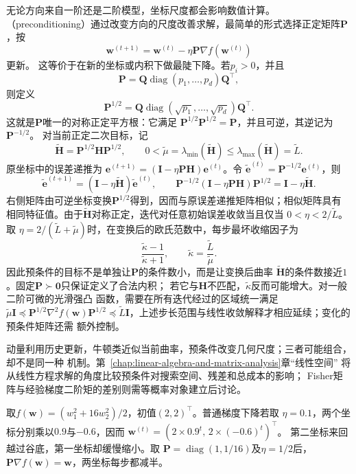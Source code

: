 无论方向来自一阶还是二阶模型，坐标尺度都会影响数值计算。
（preconditioning）通过改变方向的尺度改善求解，最简单的形式选择正定矩阵$\bm{P}$，按
\[
  \bm{w}^{(t+1)}
  =
  \bm{w}^{(t)}-\eta\bm{P}\nabla f(\bm{w}^{(t)})
\]
更新。
这等价于在新的坐标或内积下做最陡下降。若\(p_i>0\)，并且
\[
  \bm{P}
  =
  \bm{Q}\operatorname{diag}(p_1,\ldots,p_d)\bm{Q}^{\top},
\]
则定义
\[
  \bm{P}^{1/2}
  =
  \bm{Q}\operatorname{diag}(\sqrt{p_1},\ldots,\sqrt{p_d})\bm{Q}^{\top}.
\]
这就是$\bm{P}$唯一的对称正定平方根：它满足
$\bm{P}^{1/2}\bm{P}^{1/2}=\bm{P}$，并且可逆，其逆记为$\bm{P}^{-1/2}$。
对当前正定二次目标，记
\[
  \widetilde{\bm{H}}=\bm{P}^{1/2}\bm{H}\bm{P}^{1/2},
  \qquad
  0<\widetilde{\mu}
  =\lambda_{\min}(\widetilde{\bm{H}})
  \leq\lambda_{\max}(\widetilde{\bm{H}})
  =\widetilde{L}.
\]
原坐标中的误差递推为
$\bm{e}^{(t+1)}=(\bm{I}-\eta\bm{P}\bm{H})\bm{e}^{(t)}$。令
$\widetilde{\bm{e}}^{(t)}=\bm{P}^{-1/2}\bm{e}^{(t)}$，则
\[
  \widetilde{\bm{e}}^{(t+1)}
  =
  (\bm{I}-\eta\widetilde{\bm{H}})
  \widetilde{\bm{e}}^{(t)},
  \qquad
  \bm{P}^{-1/2}
  (\bm{I}-\eta\bm{P}\bm{H})
  \bm{P}^{1/2}
  =
  \bm{I}-\eta\widetilde{\bm{H}}.
\]
右侧矩阵由可逆坐标变换$\bm{P}^{1/2}$得到，因而与原误差递推矩阵相似；相似矩阵具有
相同特征值。由于$\widetilde{\bm{H}}$对称正定，迭代对任意初始误差收敛当且仅当
$0<\eta<2/\widetilde{L}$。取
$\eta=2/(\widetilde{L}+\widetilde{\mu})$时，在变换后的欧氏范数中，每步最坏收缩因子为
\[
  \frac{\widetilde{\kappa}-1}{\widetilde{\kappa}+1},
  \qquad
  \widetilde{\kappa}
  =\frac{\widetilde{L}}{\widetilde{\mu}}.
\]
因此预条件的目标不是单独让$\bm{P}$的条件数小，而是让变换后曲率
$\widetilde{\bm{H}}$的条件数接近$1$。固定$\bm{P}\succ\bm{0}$只保证定义了合法内积；
若它与$\bm{H}$不匹配，$\widetilde{\kappa}$反而可能增大。对一般二阶可微的光滑强凸
函数，需要在所有迭代经过的区域统一满足
$\widetilde{\mu}\bm{I}\preceq
\bm{P}^{1/2}\nabla^2f(\bm{w})\bm{P}^{1/2}
\preceq\widetilde{L}\bm{I}$，上述步长范围与线性收敛解释才相应延续；变化的预条件矩阵还需
额外控制。

动量利用历史更新，牛顿类近似当前曲率，预条件改变几何尺度；三者可能组合，却不是同一种
机制。第~\ref{chap:linear-algebra-and-matrix-analysis}章“线性空间”
将从线性方程求解的角度比较预条件对搜索空间、残差和总成本的影响；
Fisher矩阵与经验梯度二阶矩的差别则需等概率对象建立后讨论。

\begin{example}[两个曲率方向上的预条件]
\label{ex:opt-anisotropic-preconditioning}
取$f(\bm w)=(w_1^2+16w_2^2)/2$，初值$(2,2)^{\top}$。普通梯度下降若取
$\eta=0.1$，两个坐标分别乘以$0.9$与$-0.6$，因而
$\bm w^{(t)}=(2\times0.9^t,\,2\times(-0.6)^t)^{\top}$。
第二坐标来回越过谷底，第一坐标却缓慢缩小。取
$\bm P=\operatorname{diag}(1,1/16)$及$\eta=1/2$后，
$\bm P\nabla f(\bm w)=\bm w$，两坐标每步都减半。
\end{example}

